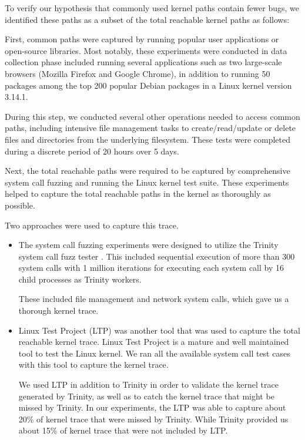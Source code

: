 To verify our hypothesis that commonly used kernel paths contain fewer bugs, 
we identified these paths as a subset of the total reachable kernel paths as follows:

First, common paths were captured by running popular user applications or open-source libraries. Most notably, these experiments were conducted in data collection phase included running several applications such as two large-scale browsers (Mozilla Firefox and Google Chrome), in addition to running 50 packages among the top 200 popular Debian packages \cite{Top-Packages} in a Linux kernel version 3.14.1.

During this step, we conducted several other operations needed to access common paths, including intensive file management tasks to create/read/update or delete files and directories from the underlying filesystem. These tests were completed during a discrete period of 20 hours over 5 days.

Next, the total reachable paths were required to be captured by comprehensive system call fuzzing and running the Linux kernel test suite. These experiments helped to capture the total reachable paths in the kernel as thoroughly  as possible. 

Two approaches were used to capture this trace.

\begin{itemize}
\item The system call fuzzing experiments were designed to utilize the Trinity system call fuzz tester \cite{Trinity}. This included sequential execution of more than 300 system calls with 1 million iterations for executing each system call by 16 child processes as Trinity workers.

These included file management and network system calls,  which gave us a thorough kernel trace. 

\item Linux Test Project (LTP) \cite{LTP} was another tool that was used to capture the total reachable kernel trace.
Linux Test Project is a mature and well maintained tool to test the Linux
kernel. 
We ran all the available system call test cases with this tool to capture
the kernel trace. 

We used LTP in addition to Trinity in order to validate the kernel trace generated 
by Trinity, as well as to catch the kernel trace that might be missed by Trinity. 
In our experiments, the LTP was able to capture about 20\% of kernel trace 
that were missed by Trinity. While Trinity provided us about 15\% of kernel trace 
that were not included by LTP. 
\end{itemize}

